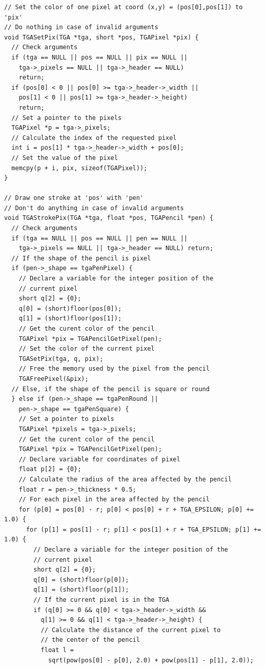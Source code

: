 \documentclass[12pt, a4paper]{article}
\begin{document}
\begin{scriptsize}
\begin{ttfamily}
\begin{lstlisting}
// Set the color of one pixel at coord (x,y) = (pos[0],pos[1]) to 'pix'
// Do nothing in case of invalid arguments
void TGASetPix(TGA *tga, short *pos, TGAPixel *pix) {
  // Check arguments
  if (tga == NULL || pos == NULL || pix == NULL ||
    tga->_pixels == NULL || tga->_header == NULL) 
    return;
  if (pos[0] < 0 || pos[0] >= tga->_header->_width || 
    pos[1] < 0 || pos[1] >= tga->_header->_height) 
    return;
  // Set a pointer to the pixels
  TGAPixel *p = tga->_pixels;
  // Calculate the index of the requested pixel
  int i = pos[1] * tga->_header->_width + pos[0];
  // Set the value of the pixel
  memcpy(p + i, pix, sizeof(TGAPixel));
}

// Draw one stroke at 'pos' with 'pen'
// Don't do anything in case of invalid arguments
void TGAStrokePix(TGA *tga, float *pos, TGAPencil *pen) {
  // Check arguments
  if (tga == NULL || pos == NULL || pen == NULL ||
    tga->_pixels == NULL || tga->_header == NULL) return;
  // If the shape of the pencil is pixel 
  if (pen->_shape == tgaPenPixel) {
    // Declare a variable for the integer position of the 
    // current pixel
    short q[2] = {0};
    q[0] = (short)floor(pos[0]);
    q[1] = (short)floor(pos[1]);
    // Get the curent color of the pencil
    TGAPixel *pix = TGAPencilGetPixel(pen);
    // Set the color of the current pixel
    TGASetPix(tga, q, pix);
    // Free the memory used by the pixel from the pencil
    TGAFreePixel(&pix);
  // Else, if the shape of the pencil is square or round
  } else if (pen->_shape == tgaPenRound || 
    pen->_shape == tgaPenSquare) {
    // Set a pointer to pixels
    TGAPixel *pixels = tga->_pixels;
    // Get the curent color of the pencil
    TGAPixel *pix = TGAPencilGetPixel(pen);
    // Declare variable for coordinates of pixel
    float p[2] = {0};
    // Calculate the radius of the area affected by the pencil
    float r = pen->_thickness * 0.5;
    // For each pixel in the area affected by the pencil
    for (p[0] = pos[0] - r; p[0] < pos[0] + r + TGA_EPSILON; p[0] += 1.0) {
      for (p[1] = pos[1] - r; p[1] < pos[1] + r + TGA_EPSILON; p[1] += 1.0) {
        // Declare a variable for the integer position of the 
        // current pixel
        short q[2] = {0};
        q[0] = (short)floor(p[0]);
        q[1] = (short)floor(p[1]);
        // If the current pixel is in the TGA
        if (q[0] >= 0 && q[0] < tga->_header->_width && 
          q[1] >= 0 && q[1] < tga->_header->_height) {
          // Calculate the distance of the current pixel to 
          // the center of the pencil
          float l = 
            sqrt(pow(pos[0] - p[0], 2.0) + pow(pos[1] - p[1], 2.0));

\end{lstlisting}
\end{ttfamily}
\end{scriptsize}
\end{document}
